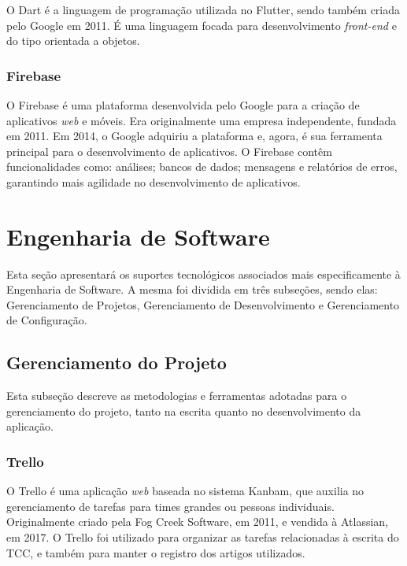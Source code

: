 O Dart \cite{flutter2017} é a linguagem de programação utilizada no Flutter, sendo também 
criada pelo Google em 2011. É uma linguagem focada para 
desenvolvimento \emph{front-end} e do tipo orientada a objetos.

\subsubsection{Firebase}

O Firebase \cite{firebase2011} é uma plataforma desenvolvida pelo Google para a criação de aplicativos 
\emph{web} e móveis. Era originalmente uma empresa independente, fundada em 2011. 
Em 2014, o Google adquiriu a plataforma e, agora, é sua ferramenta principal 
para o desenvolvimento de aplicativos. O Firebase contêm funcionalidades como: 
análises; bancos de dados; mensagens e relatórios de erros, garantindo mais agilidade no desenvolvimento de aplicativos.

\section{Engenharia de Software}

Esta seção apresentará os suportes tecnológicos associados mais especificamente 
à Engenharia de Software. A mesma foi dividida em três subseções, sendo elas: 
Gerenciamento de Projetos, Gerenciamento de Desenvolvimento e Gerenciamento de 
Configuração.

\subsection{Gerenciamento do Projeto}

Esta subseção descreve as metodologias e ferramentas adotadas para o gerenciamento 
do projeto, tanto na escrita quanto no desenvolvimento da aplicação.

\subsubsection{Trello}

O Trello \cite{trello2011} é uma aplicação \emph{web} baseada no sistema Kanbam, que auxilia no 
gerenciamento de tarefas para times grandes ou pessoas individuais. 
Originalmente criado pela Fog Creek Software, em 2011, e vendida à Atlassian, em 
2017. O Trello foi utilizado para organizar as tarefas 
relacionadas à escrita do TCC, e também para manter o registro dos artigos utilizados.

